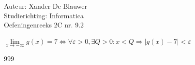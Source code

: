 \documentclass[a4paper]{article}
\begin{document}
\noindent \large Auteur: Xander De Blauwer \\
\noindent \large Studierichting: Informatica\\
\noindent \large Oefeningenreeks 2C nr. 9.2\\

\medskip

\normalsize



$\lim\limits_{x \rightarrow -\infty} g(x) = 7 \Leftrightarrow \forall \varepsilon > 0,\exists Q > 0: x < Q \Rightarrow |g(x) -7| < \varepsilon$ \\



\begin{thebibliography}{999}
\end{thebibliography}
\end{document}
